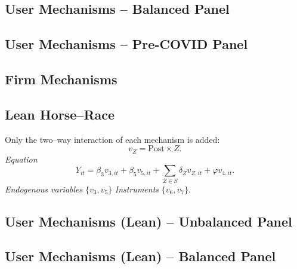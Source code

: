 \documentclass{article}
\newcommand{\cleanedresultsdir}{../results/cleaned}
\begin{document}
\begin{landscape}
\subsection{User Mechanisms -- Balanced Panel}

\end{landscape}

\begin{landscape}
\subsection{User Mechanisms -- Pre-COVID Panel}

\end{landscape}

\clearpage
\begin{landscape}
\subsection{Firm Mechanisms}

\end{landscape}


\clearpage
\subsection*{Lean Horse–Race}
Only the two–way interaction of each mechanism is added:
\[v_Z = \text{Post}\!\times\! Z.\]
\emph{Equation}
\[Y_{it}=\beta_3 v_{3,it}+\beta_5 v_{5,it}+\sum_{Z\in S}\delta_Z v_{Z,it}+\varphi v_{4,it}.
\]
\emph{Endogenous variables}\; $\{v_3,v_5\}$ \quad\emph{Instruments}\; $\{v_6,v_7\}$.


\clearpage
\begin{landscape}
\subsection{User Mechanisms (Lean) -- Unbalanced Panel}

\end{landscape}

\begin{landscape}
\subsection{User Mechanisms (Lean) -- Balanced Panel}

\end{landscape}
\end{document}
